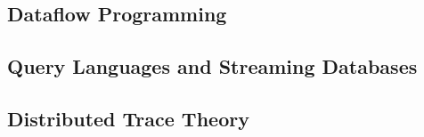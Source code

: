 
\subsection{Dataflow Programming}

\subsection{Query Languages and Streaming Databases}

\subsection{Distributed Trace Theory}
